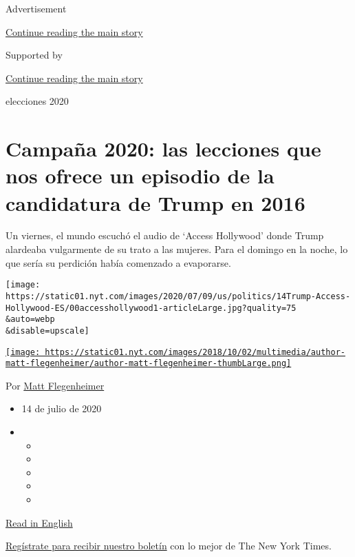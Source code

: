 Advertisement

\protect\hyperlink{after-top}{Continue reading the main story}

Supported by

\protect\hyperlink{after-sponsor}{Continue reading the main story}

elecciones 2020

\hypertarget{campauxf1a-2020-las-lecciones-que-nos-ofrece-un-episodio-de-la-candidatura-de-trump-en-2016}{%
\section{Campaña 2020: las lecciones que nos ofrece un episodio de la
candidatura de Trump en
2016}\label{campauxf1a-2020-las-lecciones-que-nos-ofrece-un-episodio-de-la-candidatura-de-trump-en-2016}}

Un viernes, el mundo escuchó el audio de `Access Hollywood' donde Trump
alardeaba vulgarmente de su trato a las mujeres. Para el domingo en la
noche, lo que sería su perdición había comenzado a evaporarse.

\texttt{[image: https://static01.nyt.com/images/2020/07/09/us/politics/14Trump-Access-Hollywood-ES/00accesshollywood1-articleLarge.jpg?quality=75\\\&auto=webp\\\&disable=upscale]}

\href{https://www.nytimes.com/by/matt-flegenheimer}{\texttt{[image: https://static01.nyt.com/images/2018/10/02/multimedia/author-matt-flegenheimer/author-matt-flegenheimer-thumbLarge.png]}}

Por \href{https://www.nytimes.com/by/matt-flegenheimer}{Matt
Flegenheimer}

\begin{itemize}
\item
  14 de julio de 2020
\item
  \begin{itemize}
  \item
  \item
  \item
  \item
  \item
  \end{itemize}
\end{itemize}

\href{https://www.nytimes.com/2020/07/12/us/politics/donald-trump-access-hollywood.html}{Read
in English}

\href{https://www.nytimes.com/newsletters/el-times}{Regístrate para
recibir nuestro boletín} con lo mejor de The New York Times.

